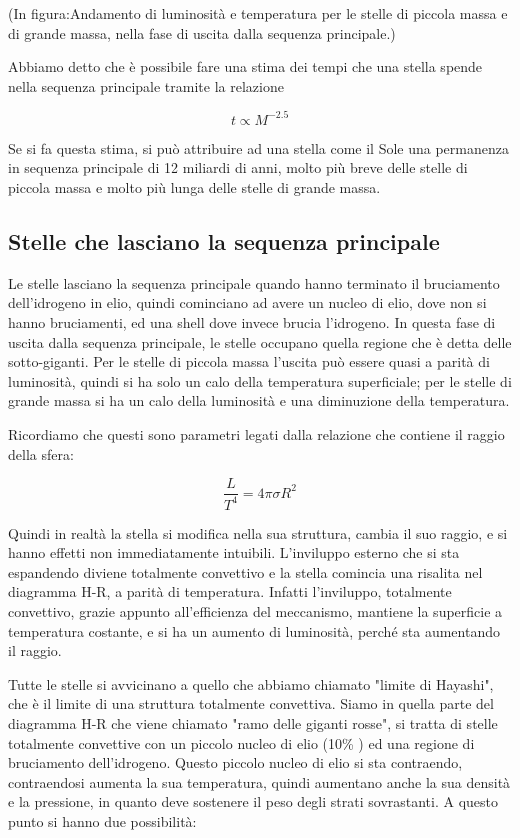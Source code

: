 (In figura:Andamento di luminosità e temperatura per le stelle di piccola massa e di grande massa, nella fase di uscita dalla sequenza principale.)

Abbiamo detto che è possibile fare una stima dei tempi che una stella spende nella sequenza principale tramite la relazione

$$t \propto M ^{-2.5}$$

Se si fa questa stima, si può attribuire ad una stella come il Sole una permanenza in sequenza principale di 12 miliardi di anni, molto più breve delle stelle di piccola massa e molto più lunga delle stelle di grande massa.

\subsection{Stelle che lasciano la sequenza principale}
Le stelle lasciano la sequenza principale quando hanno terminato il bruciamento dell'idrogeno in elio, quindi cominciano ad avere un nucleo di elio, dove non si hanno bruciamenti, ed una shell dove invece brucia l'idrogeno. In questa fase di uscita dalla sequenza principale, le stelle occupano quella regione che è detta delle sotto-giganti. Per le stelle di piccola massa l'uscita può essere quasi a parità di luminosità, quindi si ha solo un calo della temperatura superficiale; per le stelle di grande massa si ha un calo della luminosità e una diminuzione della temperatura.

Ricordiamo che questi sono parametri legati dalla relazione che contiene il raggio della sfera:

$$\frac{L}{T^{4}} = 4 \pi \sigma R^{2}$$

Quindi in realtà la stella si modifica nella sua struttura, cambia il suo raggio, e si hanno effetti non immediatamente intuibili. L'inviluppo esterno che si sta espandendo diviene totalmente convettivo e la stella comincia una risalita nel diagramma H-R, a parità di temperatura. Infatti l'inviluppo, totalmente convettivo, grazie appunto all'efficienza del meccanismo, mantiene la superficie a temperatura costante, e si ha un aumento di luminosità, perché sta aumentando il raggio.

Tutte le stelle si avvicinano a quello che abbiamo chiamato "limite di Hayashi", che è il limite di una struttura totalmente convettiva. Siamo in quella parte del diagramma H-R che viene chiamato "ramo delle giganti rosse", si tratta di stelle totalmente convettive con un piccolo nucleo di elio (10\% ) ed una regione di bruciamento dell'idrogeno. Questo piccolo nucleo di elio si sta contraendo, contraendosi aumenta la sua temperatura, quindi aumentano anche la sua densità e la pressione, in quanto deve sostenere il peso degli strati sovrastanti. A questo punto si hanno due possibilità:

